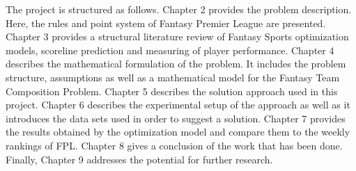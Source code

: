 \newpage

The project is structured as follows. Chapter 2 provides the problem description. Here, the rules and point system of Fantasy Premier League are presented. Chapter 3 provides a structural literature review of Fantasy Sports optimization models, scoreline prediction and measuring of player performance. Chapter 4 describes the mathematical formulation of the problem. It includes the problem structure, assumptions as well as a mathematical model for the Fantasy Team Composition Problem. Chapter 5 describes the solution approach used in this project. Chapter 6 describes the experimental setup of the approach as well as it introduces the data sets used in order to suggest a solution. Chapter 7 provides the results obtained by the optimization model and compare them to the weekly rankings of FPL. Chapter 8 gives a conclusion of the work that has been done. Finally, Chapter 9 addresses the potential for further research.
